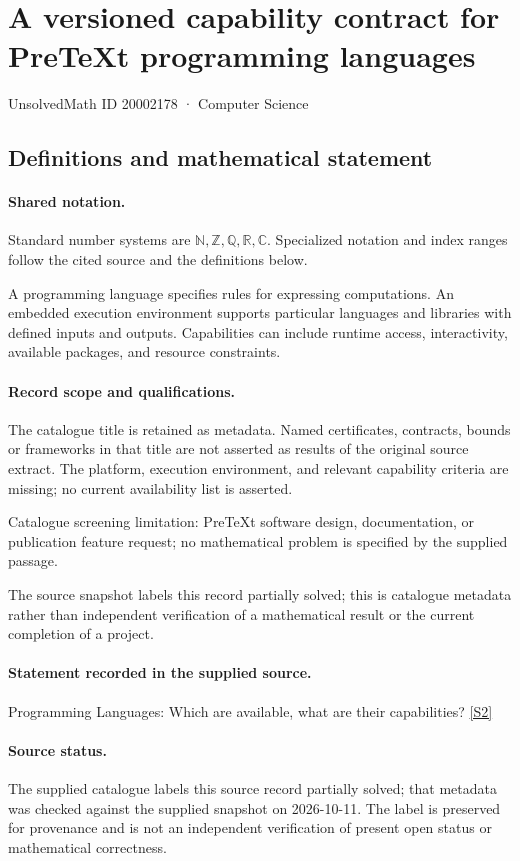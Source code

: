 \documentclass[11pt]{article}
\newcommand{\sref}[2]{\hyperlink{source:#1:#2}{[S#2]}}
\begin{document}
\setcounter{section}{20002177}
\section{A versioned capability contract for PreTeXt programming languages}\label{20002178}
{\small\sffamily UnsolvedMath ID 20002178 · Computer Science}
\subsection{Definitions and mathematical statement}

\paragraph{Shared notation.}Standard number systems are $\mathbb N,\mathbb Z,\mathbb Q,\mathbb R,\mathbb C$. Specialized notation and index ranges follow the cited source and the definitions below.


A programming language specifies rules for expressing computations. An embedded execution environment supports particular languages and libraries with defined inputs and outputs. Capabilities can include runtime access, interactivity, available packages, and resource constraints.
\paragraph{Record scope and qualifications.}
The catalogue title is retained as metadata. Named certificates, contracts, bounds or frameworks in that title are not asserted as results of the original source extract.
The platform, execution environment, and relevant capability criteria are missing; no current availability list is asserted.

Catalogue screening limitation: PreTeXt software design, documentation, or publication feature request; no mathematical problem is specified by the supplied passage.

The source snapshot labels this record partially solved; this is catalogue metadata rather than independent verification of a mathematical result or the current completion of a project.
\paragraph{Statement recorded in the supplied source.}
Programming Languages: Which are available, what are their capabilities? \sref{20002178}{2}
\paragraph{Source status.}
The supplied catalogue labels this source record partially solved; that metadata was checked against the supplied snapshot on 2026-10-11. The label is preserved for provenance and is not an independent verification of present open status or mathematical correctness.
\end{document}
